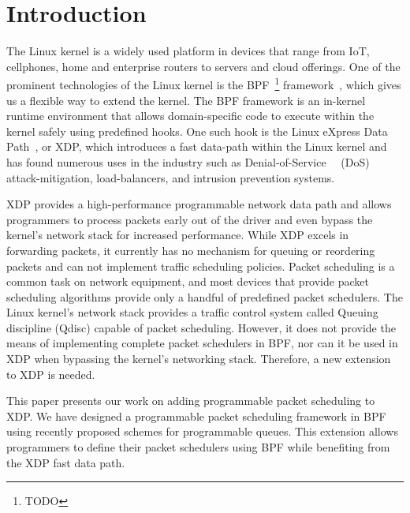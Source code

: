 \documentclass[sigconf, nonacm]{acmart}
\begin{document}

\maketitle

\section{Introduction}

The Linux kernel is a widely used platform in devices that range from IoT, cellphones, home and enterprise routers to servers and cloud offerings. One of the prominent technologies of the Linux kernel is the BPF~\footnote{TODO} framework~\cite{ebpf}, which gives us a flexible way to extend the kernel. The BPF framework is an in-kernel runtime environment that allows domain-specific code to execute within the kernel safely using predefined hooks. One such hook is the Linux eXpress Data Path~\cite{hoiland2018express}, or XDP, which introduces a fast data-path within the Linux kernel and has found numerous uses in the industry such as Denial-of-Service~\cite{bertin2017xdp}~\cite{miano2019introducing} (DoS) attack-mitigation, load-balancers, and intrusion prevention systems.

XDP provides a high-performance programmable network data path and allows programmers to process packets early out of the driver and even bypass the kernel's network stack for increased performance. While XDP excels in forwarding packets, it currently has no mechanism for queuing or reordering packets and can not implement traffic scheduling policies. Packet scheduling is a common task on network equipment, and most devices that provide packet scheduling algorithms provide only a handful of predefined packet schedulers. The Linux kernel's network stack provides a traffic control system called Queuing discipline (Qdisc) capable of packet scheduling. However, it does not provide the means of implementing complete packet schedulers in BPF, nor can it be used in XDP when bypassing the kernel's networking stack. Therefore, a new extension to XDP is needed.

This paper presents our work on adding programmable packet scheduling to XDP. We have designed a programmable packet scheduling framework in BPF using recently proposed schemes for programmable queues. This extension allows programmers to define their packet schedulers using BPF while benefiting from the XDP fast data path.
\end{document}
